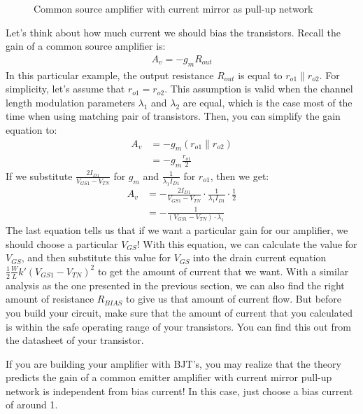 \documentclass{article}
\begin{document}
\begin{figure}[!htb]
  
  \centerline{\box\graph}
  \caption{Common source amplifier with current mirror as pull-up network}
  \label{ccsource}
\end{figure}

Let's think about how much current we should bias the transistors. Recall the gain of a common source amplifier is:
\begin{align*}
	A_v = -g_mR_{out}
\end{align*}
In this particular example, the output resistance $R_{out}$ is equal to $r_{o1} \parallel r_{o2}$. For simplicity, let's assume that $r_{o1} = r_{o2}$. This assumption is valid when the channel length modulation parameters $\lambda_1$ and $\lambda_2$ are equal, which is the case most of the time when using matching pair of transistors. Then, you can simplify the gain equation to:
\begin{align*}
	A_v &= -g_m\left(r_{o1} \parallel r_{o2}\right) \\
	    &= -g_m\frac{r_{o1}}{2}
\end{align*}
If we substitute $\frac{2I_{D1}}{V_{GS1}-V_{TN}}$ for $g_m$ and $\frac{1}{\lambda_1I_{D1}}$ for $r_{o1}$, then we get:
\begin{align*}
	A_v &= -\frac{2I_{D1}}{V_{GS1}-V_{TN}}\cdot\frac{1}{\lambda_1I_{D1}}\cdot\frac{1}{2} \\
	    &= -\frac{1}{\left(V_{GS1}-V_{TN}\right)\cdot\lambda_1}
\end{align*}
The last equation tells us that if we want a particular gain for our amplifier, we should choose a particular $V_{GS}$! With this equation, we can calculate the value for $V_{GS}$, and then substitute this value for $V_{GS}$ into the drain current equation $\frac{1}{2}\frac{W}{L}k'\left(V_{GS1}-V_{TN}\right)^2$ to get the amount of current that we want. With a similar analysis as the one presented in the previous section, we can also find the right amount of resistance $R_{BIAS}$ to give us that amount of current flow. But before you build your circuit, make sure that the amount of current that you calculated is within the safe operating range of your transistors. You can find this out from the datasheet of your transistor.

If you are building your amplifier with BJT's, you may realize that the theory predicts the gain of a common emitter amplifier with current mirror pull-up network is independent from bias current! In this case, just choose a bias current of around \unit{1}{\milli\ampere}.
\end{document}
